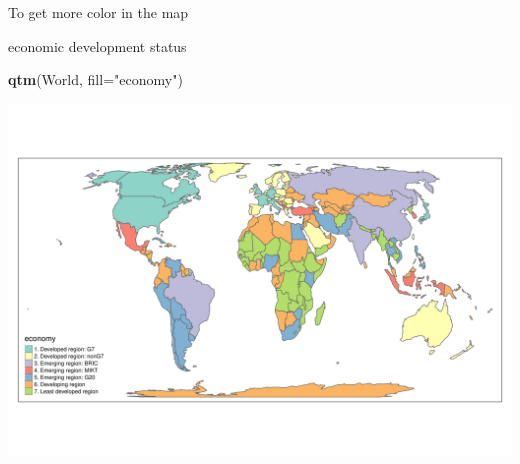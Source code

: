 \documentclass[
  ignorenonframetext,
]{beamer}
\newenvironment{Shaded}{\begin{snugshade}}{\end{snugshade}}
\newcommand{\DataTypeTok}[1]{\textcolor[rgb]{0.13,0.29,0.53}{#1}}
\newcommand{\KeywordTok}[1]{\textcolor[rgb]{0.13,0.29,0.53}{\textbf{#1}}}
\newcommand{\NormalTok}[1]{#1}
\newcommand{\StringTok}[1]{\textcolor[rgb]{0.31,0.60,0.02}{#1}}
\begin{document}
\begin{frame}[fragile]{To get more color in the map}
\protect\hypertarget{to-get-more-color-in-the-map}{}
\begin{block}{economic development status}
\protect\hypertarget{economic-development-status}{}
\begin{Shaded}
\begin{Highlighting}[]
\KeywordTok{qtm}\NormalTok{(World, }\DataTypeTok{fill=}\StringTok{"economy"}\NormalTok{)}
\end{Highlighting}
\end{Shaded}

\includegraphics{quick_high_quality_maps_files/figure-beamer/unnamed-chunk-4-1.pdf}
\end{block}
\end{frame}
\end{document}
